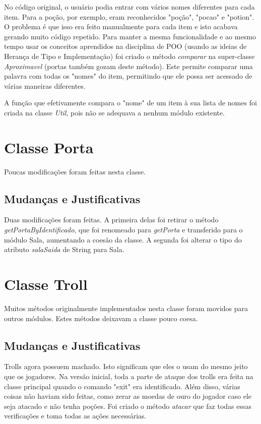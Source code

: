 \documentclass[runningheads,a4paper]{llncs}
\begin{document}
        No código original, o usuário podia entrar com vários nomes diferentes para cada item. Para a poção, por exemplo, eram reconhecidos "poção", "pocao" e "potion". O problema é que isso era feito manualmente para cada item e isto acabava gerando muito código repetido. Para manter a mesma funcionalidade e ao mesmo tempo usar os conceitos aprendidos na disciplina de POO (usando as ideias de Herança de Tipo e Implementação) foi criado o método \emph{comparar} na super-classe \emph{Aproximavel} (portas também gozam deste método). Este permite comparar uma palavra com todas os "nomes" do item, permitindo que ele possa ser acessado de várias maneiras diferentes.
        
        A função que efetivamente compara o "nome" de um item à sua lista de nomes foi criada na classe \emph{Util}, pois não se adequava a nenhum módulo existente.

\section{Classe Porta}
    Poucas modificações foram feitas nesta classe.

    \subsection{Mudanças e Justificativas}
        Duas modificações foram feitas. A primeira delas foi retirar o método \emph{getPortaByIdentificado}, que foi renomeado para \emph{getPorta} e transferido para o módulo Sala, aumentando a coesão da classe. A segunda foi alterar o tipo do atributo \emph{salaSaida} de String para Sala.

\section{Classe Troll}
    Muitos métodos originalmente implementados nesta classe foram movidos para outros módulos. Estes métodos deixavam a classe pouco coesa.

    \subsection{Mudanças e Justificativas}
        Trolls agora possuem machado. Isto significam que eles o usam do mesmo jeito que os jogadores. Na versão inicial, toda a parte de ataque dos trolls era feita na classe principal quando o comando "exit" era identificado. Além disso, várias coisas não haviam sido feitas, como zerar as moedas de ouro do jogador caso ele seja atacado e não tenha poções. Foi criado o método \emph{atacar} que faz todas essas verificações e toma todas as ações necessárias.
\end{document}
